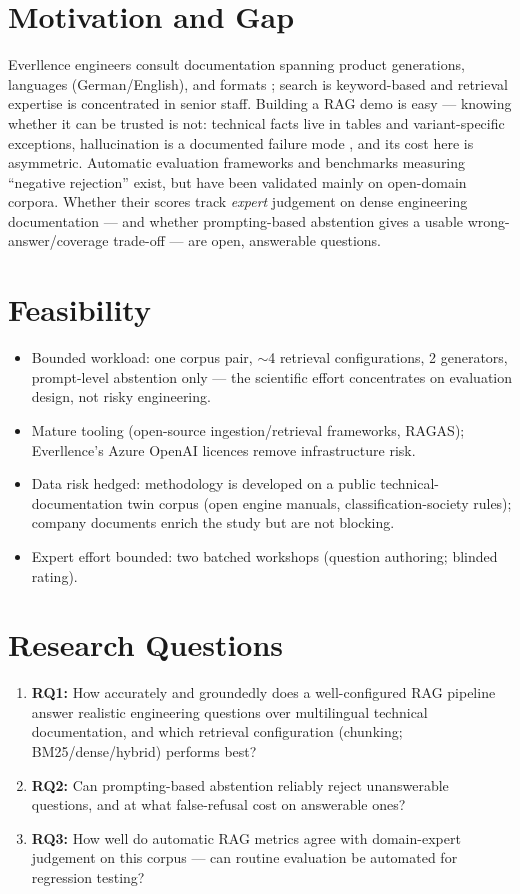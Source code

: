 \documentclass[10pt,a4paper]{article}
\begin{document}
\section{Motivation and Gap}

Everllence engineers consult documentation spanning product generations, languages (German/English), and formats \cite{everllence2025}; search is keyword-based and retrieval expertise is concentrated in senior staff. Building a RAG demo is easy --- knowing whether it can be trusted is not: technical facts live in tables and variant-specific exceptions, hallucination is a documented failure mode \cite{ji2023survey}, and its cost here is asymmetric. Automatic evaluation frameworks \cite{es2023ragas, saadfalcon2024ares} and benchmarks measuring ``negative rejection'' \cite{chen2024benchmark} exist, but have been validated mainly on open-domain corpora. Whether their scores track \emph{expert} judgement on dense engineering documentation --- and whether prompting-based abstention gives a usable wrong-answer/coverage trade-off --- are open, answerable questions.

\section{Feasibility}

\begin{itemize}
    \item Bounded workload: one corpus pair, $\sim$4 retrieval configurations, 2 generators, prompt-level abstention only --- the scientific effort concentrates on evaluation design, not risky engineering.
    \item Mature tooling (open-source ingestion/retrieval frameworks, RAGAS); Everllence's Azure OpenAI licences remove infrastructure risk.
    \item Data risk hedged: methodology is developed on a public technical-documentation twin corpus (open engine manuals, classification-society rules); company documents enrich the study but are not blocking.
    \item Expert effort bounded: two batched workshops (question authoring; blinded rating).
\end{itemize}

\section{Research Questions}

\begin{enumerate}
    \item \textbf{RQ1:} How accurately and groundedly does a well-configured RAG pipeline answer realistic engineering questions over multilingual technical documentation, and which retrieval configuration (chunking; BM25/dense/hybrid) performs best?
    \item \textbf{RQ2:} Can prompting-based abstention reliably reject unanswerable questions, and at what false-refusal cost on answerable ones?
    \item \textbf{RQ3:} How well do automatic RAG metrics agree with domain-expert judgement on this corpus --- can routine evaluation be automated for regression testing?
\end{enumerate}
\end{document}
